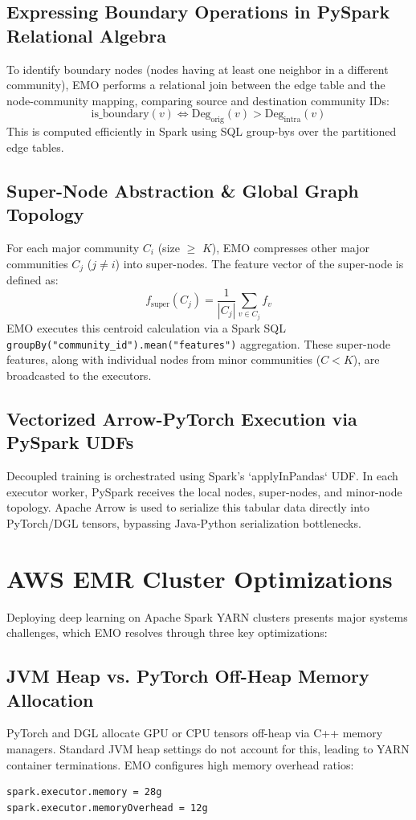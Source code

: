 \documentclass[conference,compsoc]{IEEEtran}
\begin{document}
\subsection{Expressing Boundary Operations in PySpark Relational Algebra}
To identify boundary nodes (nodes having at least one neighbor in a different community), EMO performs a relational join between the edge table and the node-community mapping, comparing source and destination community IDs:
\begin{equation}
\text{is\_boundary}(v) \iff \text{Deg}_{\text{orig}}(v) > \text{Deg}_{\text{intra}}(v)
\end{equation}
This is computed efficiently in Spark using SQL group-bys over the partitioned edge tables.

\subsection{Super-Node Abstraction \& Global Graph Topology}
For each major community $C_i$ (size $\ge$ $K$), EMO compresses other major communities $C_j$ ($j \neq i$) into super-nodes. The feature vector of the super-node is defined as:
\begin{equation}
f_{\text{super}}(C_j) = \frac{1}{|C_j|} \sum_{v \in C_j} f_v
\end{equation}
EMO executes this centroid calculation via a Spark SQL \verb|groupBy("community_id").mean("features")| aggregation. These super-node features, along with individual nodes from minor communities ($C < K$), are broadcasted to the executors.

\subsection{Vectorized Arrow-PyTorch Execution via PySpark UDFs}
Decoupled training is orchestrated using Spark's `applyInPandas` UDF. In each executor worker, PySpark receives the local nodes, super-nodes, and minor-node topology. Apache Arrow is used to serialize this tabular data directly into PyTorch/DGL tensors, bypassing Java-Python serialization bottlenecks.

\section{AWS EMR Cluster Optimizations}
Deploying deep learning on Apache Spark YARN clusters presents major systems challenges, which EMO resolves through three key optimizations:

\subsection{JVM Heap vs. PyTorch Off-Heap Memory Allocation}
PyTorch and DGL allocate GPU or CPU tensors off-heap via C++ memory managers. Standard JVM heap settings do not account for this, leading to YARN container terminations. EMO configures high memory overhead ratios:
\begin{lstlisting}[basicstyle=\footnotesize\ttfamily,columns=fullflexible]
spark.executor.memory = 28g
spark.executor.memoryOverhead = 12g
\end{lstlisting}
\end{document}
